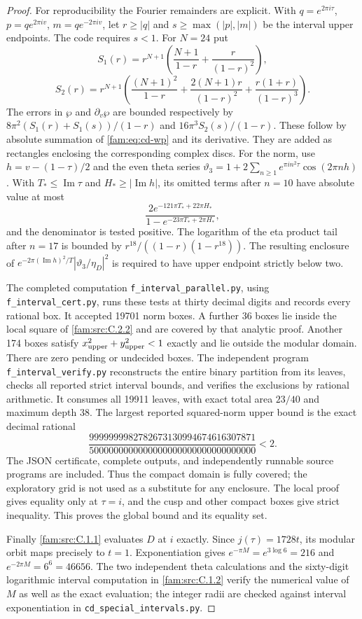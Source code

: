 \begin{proof}
For reproducibility the Fourier remainders are explicit. With
$q=e^{2\pi i\tau}$, $p=q e^{2\pi iv}$, $m=q e^{-2\pi iv}$, let
$r\geq|q|$ and $s\geq\max(|p|,|m|)$ be the interval upper endpoints.
The code requires $s<1$. For $N=24$ put
\[
 S_1(r)=r^{N+1}\left(\frac{N+1}{1-r}+\frac r{(1-r)^2}\right),
\]
\[
 S_2(r)=r^{N+1}\left(\frac{(N+1)^2}{1-r}+
 \frac{2(N+1)r}{(1-r)^2}+\frac{r(1+r)}{(1-r)^3}\right).
\]
The errors in $\wp$ and $\partial_v\wp$ are bounded respectively by
$8\pi^2(S_1(r)+S_1(s))/(1-r)$ and $16\pi^3S_2(s)/(1-r)$.
These follow by absolute summation of \eqref{fam:eq:cd-wp} and its derivative.
They are added as rectangles enclosing the corresponding complex discs.
For the norm, use $h=v-(1-\tau)/2$ and the even theta series
$\vartheta_3=1+2\sum_{n\geq1}e^{\pi i n^2\tau}\cos(2\pi nh)$.
With $T_*\leq\operatorname{Im}\tau$ and $H_*\geq|\operatorname{Im}h|$,
its omitted terms after $n=10$ have absolute value at most
\[
 \frac{2e^{-121\pi T_*+22\pi H_*}}
 {1-e^{-23\pi T_*+2\pi H_*}},
\]
and the denominator is tested positive. The logarithm of the eta
product tail after $n=17$ is bounded by
$r^{18}/((1-r)(1-r^{18}))$. The resulting enclosure of
$e^{-2\pi(\operatorname{Im}h)^2/T}|\vartheta_3/\eta_D|^2$
is required to have upper endpoint strictly below two.

The completed computation \texttt{f\_interval\_parallel.py}, using
\texttt{f\_interval\_cert.py}, runs these tests at thirty decimal digits
and records every rational box. It accepted 19701 norm boxes. A further
36 boxes lie inside the local square of \ref{fam:src:C.2.2} and are covered by that
analytic proof. Another 174 boxes satisfy
$x_{\rm upper}^2+y_{\rm upper}^2<1$ exactly and lie outside the modular
domain. There are zero pending or undecided boxes. The independent
program \texttt{f\_interval\_verify.py} reconstructs the entire binary
partition from its leaves, checks all reported strict interval bounds,
and verifies the exclusions by rational arithmetic. It consumes all
19911 leaves, with exact total area $23/40$ and maximum depth 38.
The largest reported squared-norm upper bound is the exact decimal
rational
\[
 \frac{9999999982782673130994674616307871}
 {5000000000000000000000000000000000}<2.
\]
The JSON certificate, complete outputs, and independently runnable
source programs are included. Thus the compact domain is fully covered;
the exploratory grid is not used as a substitute for any enclosure.
The local proof gives equality only at $\tau=i$, and the cusp and other
compact boxes give strict inequality. This proves the global bound and
its equality set.

Finally \ref{fam:src:C.1.1} evaluates $D$ at $i$ exactly. Since $j(\tau)=1728t$, its
modular orbit maps precisely to $t=1$. Exponentiation gives
$e^{-\pi M}=e^{3\log6}=216$ and $e^{-2\pi M}=6^6=46656$.
The two independent theta calculations and the sixty-digit logarithmic
interval computation in \ref{fam:src:C.1.2} verify the numerical value of $M$ as well
as the exact evaluation; the integer radii are checked against interval
exponentiation in \texttt{cd\_special\_intervals.py}.
\end{proof}


